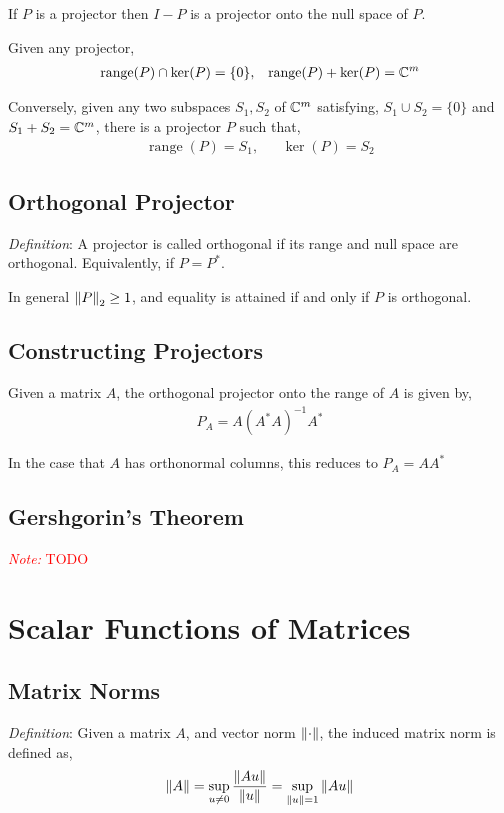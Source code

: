 \documentclass[12pt]{article}
\newcommand{\note}[1]{\textcolor{red}{\textit{Note:} #1}}
\begin{document}
If \( P \) is a projector then \( I-P \) is a projector onto the null space of \( P \).

Given any projector,
\begin{align*}
    \operatorname{range}(P) \cap \operatorname{ker}(P) = \{0\}
    ,&&
    \operatorname{range}(P) + \operatorname{ker}(P) = \mathbb{C}^{m}
\end{align*}

Conversely, given any two subspaces \( S_1,S_2 \) of \( \mathbb{C}^m \) satisfying, \( S_1\cup S_2 = \{0\} \) and \( S_1+S_2=\mathbb{C}^m \), there is a projector \( P \) such that,
\begin{align*}
    \operatorname{range}(P) = S_1, &&
    \operatorname{ker}(P) = S_2
\end{align*}

\subsection{Orthogonal Projector}
\textit{Definition}: A projector is called orthogonal if its range and null space are orthogonal. Equivalently, if \( P = P^* \).

In general \( \left\lVert P\right\rVert_2 \geq 1 \), and equality is attained if and only if \( P \) is orthogonal.

\subsection{Constructing Projectors}
Given a matrix \( A \), the orthogonal projector onto the range of \( A \) is given by,
\begin{align*}
    P_A = A(A^*A)^{-1}A^*
\end{align*}

In the case that \( A \) has orthonormal columns, this reduces to \( P_A = AA^* \)


\subsection{Gershgorin's Theorem}

\note{TODO}

\pagebreak

\section{Scalar Functions of Matrices}

\subsection{Matrix Norms}
\textit{Definition}: Given a matrix \( A \), and vector norm \( \left\lVert\cdot\right\rVert \), the induced matrix norm is defined as,
\begin{align*}
    \left\lVert A\right\rVert = \sup_{u\neq 0} \frac{\left\lVert Au\right\rVert}{\left\lVert u\right\rVert} = \sup_{\left\lVert u\right\rVert=1} \left\lVert Au\right\rVert
\end{align*}
\end{document}
